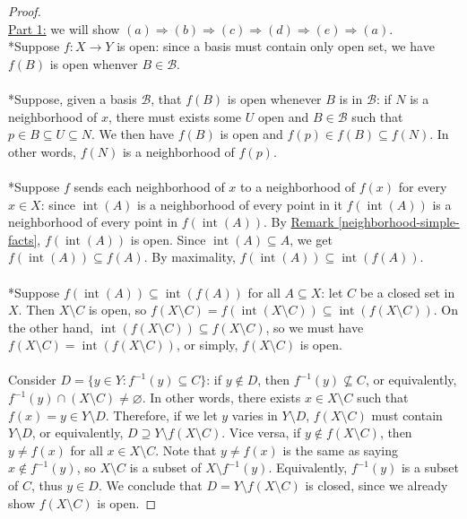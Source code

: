 \documentclass{treatise}
\begin{document}
\begin{proof} \ \\
\underline{Part 1:} we will show $(a) \Rightarrow (b) \Rightarrow (c) \Rightarrow (d) \Rightarrow (e) \Rightarrow (a)$.
\\
*Suppose $f: X \to Y$ is open: since a basis must contain only open set, we have $f(B)$ is open whenver $B \in \mathcal{B}$.
\\
\\
*Suppose, given a basis $\mathcal{B}$, that $f(B)$ is open whenever $B$ is in $\mathcal{B}$: if $N$ is a neighborhood of $x$, there must exists some $U$ open and $B \in \mathcal{B}$ such that $p \in B \subseteq U \subseteq N$. We then have $f(B)$ is open and $f(p) \in f(B) \subseteq f(N)$. In other words, $f(N)$ is a neighborhood of $f(p)$.
\\
\\
*Suppose $f$ sends each neighborhood of $x$ to a neighborhood of $f(x)$ for every $x \in X$: since $\operatorname{int}(A)$ is a neighborhood of every point in it $f(\operatorname{int}(A))$ is a neighborhood of every point in $f(\operatorname{int}(A))$. By \hyperref[neighborhood-simple-facts]{Remark \ref*{neighborhood-simple-facts}}, $f(\operatorname{int}(A))$ is open. Since $\operatorname{int}(A) \subseteq A$, we get $f(\operatorname{int}(A)) \subseteq f(A)$. By maximality, $f(\operatorname{int}(A)) \subseteq \operatorname{int}(f(A))$.
\\
\\
*Suppose $f(\operatorname{int}(A)) \subseteq \operatorname{int}(f(A))$ for all $A \subseteq X$: let $C$ be a closed set in $X$. Then $X \setminus C$ is open, so $f(X \setminus C) = f(\operatorname{int}(X \setminus C)) \subseteq \operatorname{int}(f(X \setminus C))$. On the other hand, $\operatorname{int}(f(X \setminus C)) \subseteq f(X \setminus C)$, so we must have $f(X \setminus C) = \operatorname{int}(f(X \setminus C))$, or simply, $f(X \setminus C)$ is open.
\\
\\
Consider $D = \{ y \in Y : f^{-1}(y) \subseteq C \}$: if $y \notin D$, then $f^{-1}(y) \not\subseteq C$, or equivalently, $f^{-1}(y) \cap (X \setminus C) \neq \varnothing$. In other words, there exists $x \in X \setminus C$ such that $f(x) = y \in Y \setminus D$. Therefore, if we let $y$ varies in $Y \setminus D$, $f(X \setminus C)$ must contain $Y \setminus D$, or equivalently, $D \supseteq Y \setminus f(X \setminus C)$. Vice versa, if $y \notin f(X \setminus C)$, then $y \neq f(x)$ for all $x \in X \setminus C$. Note that $y \neq f(x)$ is the same as saying $x \notin f^{-1}(y)$, so $X \setminus C$ is a subset of $X \setminus f^{-1}(y)$. Equivalently, $f^{-1}(y)$ is a subset of $C$, thus $y \in D$. We conclude that $D = Y \setminus f(X \setminus C)$ is closed, since we already show $f(X \setminus C)$ is open.

\end{proof}
\end{document}
